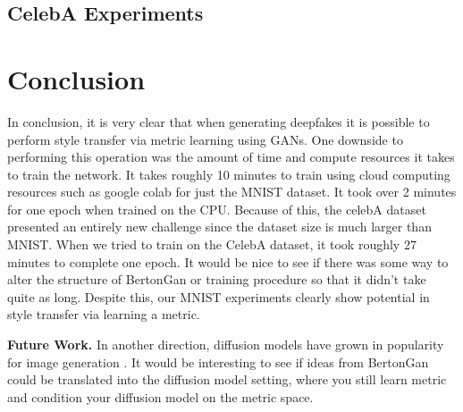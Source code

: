 \documentclass{article}
\begin{document}
\clearpage

\subsection{CelebA Experiments}



\section{Conclusion}

In conclusion, it is very clear that when generating deepfakes it is possible to perform style transfer via metric learning using GANs. One downside to
performing this operation was the amount of time and compute resources it takes to train the network. It takes roughly 10 minutes to train using cloud
computing resources such as google colab for just the MNIST dataset.
It took over 2 minutes for one epoch when trained on the CPU. Because of this, the celebA dataset presented an entirely new challenge since the
dataset size is much larger than MNIST.
When we tried to train on the CelebA dataset, it took roughly 27 minutes to complete one epoch.
It would be nice to see if there was some way to alter the structure of BertonGan or training procedure so that it didn't take quite as long.
Despite this, our MNIST experiments clearly show potential in style transfer via learning a metric.

	{\bf Future Work.} In another direction, diffusion models have grown in popularity for image generation \cite{croitoru2022diffusion}. It would be interesting to see if ideas from BertonGan could be translated into the diffusion model setting, where you still learn metric and condition your diffusion model on the metric space.



\pagebreak



\end{document}
